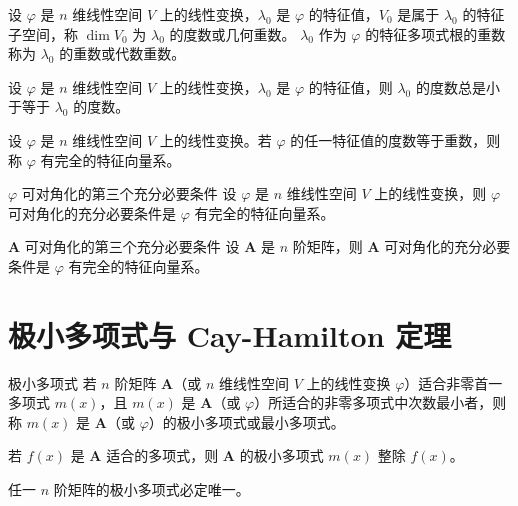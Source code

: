 \begin{definition}
    设 $\varphi$ 是 $n$ 维线性空间 $V$ 上的线性变换，$\lambda_0$ 是 $\varphi$ 的特征值，$V_0$ 是属于 $\lambda_0$ 的特征子空间，称 $\dim V_0$ 为 $\lambda_0$ 的度数或几何重数。 $\lambda_0$ 作为 $\varphi$ 的特征多项式根的重数称为 $\lambda_0$ 的重数或代数重数。
\end{definition}

\begin{lemma}
    设 $\varphi$ 是 $n$ 维线性空间 $V$ 上的线性变换，$\lambda_0$ 是 $\varphi$ 的特征值，则 $\lambda_0$ 的度数总是小于等于 $\lambda_0$ 的度数。
\end{lemma}

\begin{definition}
    设 $\varphi$ 是 $n$ 维线性空间 $V$ 上的线性变换。若 $\varphi$ 的任一特征值的度数等于重数，则称 $\varphi$ 有完全的特征向量系。
\end{definition}

\begin{theorem}{$\varphi$ 可对角化的第三个充分必要条件}
    设 $\varphi$ 是 $n$ 维线性空间 $V$ 上的线性变换，则 $\varphi$ 可对角化的充分必要条件是 $\varphi$ 有完全的特征向量系。
\end{theorem}

\begin{theorem}{$\bm{A}$ 可对角化的第三个充分必要条件}
    设 $\bm{A}$ 是 $n$ 阶矩阵，则 $\bm{A}$ 可对角化的充分必要条件是 $\varphi$ 有完全的特征向量系。
\end{theorem}




\section{极小多项式与 Cay-Hamilton 定理}

\begin{definition}{极小多项式}
    若 $n$ 阶矩阵 $\bm{A}$（或 $n$ 维线性空间 $V$ 上的线性变换 $\varphi$）适合非零首一多项式 $m(x)$，且 $m(x)$ 是 $\bm{A}$（或 $\varphi$）所适合的非零多项式中次数最小者，则称 $m(x)$ 是 $\bm{A}$（或 $\varphi$）的极小多项式或最小多项式。
\end{definition}

\begin{lemma}
    若 $f(x)$ 是 $\bm{A}$ 适合的多项式，则 $\bm{A}$ 的极小多项式 $m(x)$ 整除 $f(x)$。
\end{lemma}

\begin{proposition}
    任一 $n$ 阶矩阵的极小多项式必定唯一。
\end{proposition}

